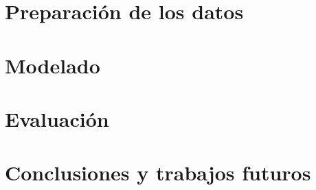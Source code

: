 \documentclass[11pt,twoside,draft]{report}
\begin{document}
    \chapter{Preparación de los datos}
    \label{crisp3}
    

    \chapter{Modelado}
    \label{crisp4}
    

    \chapter{Evaluación}
    \label{crisp5}
    

    \chapter{Conclusiones y trabajos futuros}
    \label{conclusiones}
    

    
    

    \appendix
\end{document}
